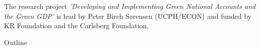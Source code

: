 

    \newcommand{\inline}[1]{}  %




\begin{frame}
    \maketitle
    \footnotesize
    The research project \textit{’Developing and Implementing Green National Accounts and the Green GDP’} is lead by Peter Birch Sørensen (UCPH/ECON) and funded by KR Foundation and the Carlsberg Foundation.
\end{frame}




\begin{frame}{Outline}
    \tableofcontents
\end{frame}






